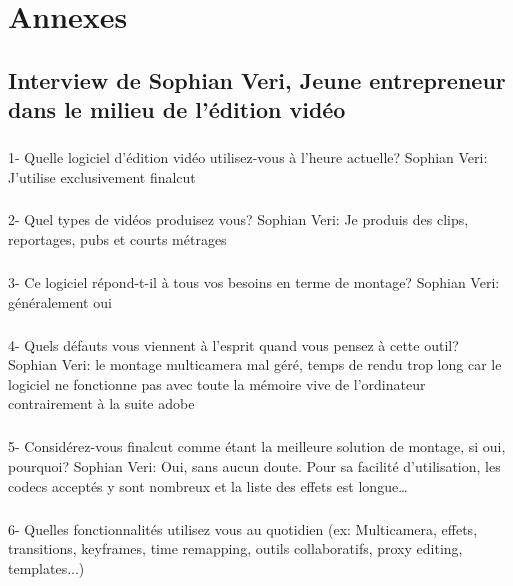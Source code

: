 \newpage

\chapter*{Annexes}
\section*{Interview de Sophian Veri,
Jeune entrepreneur dans le milieu de l'édition vidéo}

\paragraph{}
1-  Quelle logiciel d'édition vidéo utilisez-vous à l'heure actuelle?
Sophian Veri: J'utilise exclusivement finalcut

\paragraph{}
2- Quel types de vidéos produisez vous?
Sophian Veri: Je produis des clips, reportages, pubs et courts métrages

\paragraph{}
3- Ce logiciel répond-t-il à tous vos besoins en terme de montage?
Sophian Veri: généralement oui

\paragraph{}
4- Quels défauts vous viennent à l'esprit quand vous pensez à cette outil?
Sophian Veri: le montage multicamera mal géré, temps de rendu trop long car le
logiciel ne fonctionne pas avec toute la mémoire vive de l'ordinateur
contrairement à la suite adobe

\paragraph{}
5- Considérez-vous finalcut comme étant la meilleure solution de montage,
si oui, pourquoi?
Sophian Veri: Oui, sans aucun doute. Pour sa facilité d'utilisation,
les codecs acceptés y sont nombreux et la liste des effets est
longue\ldots

\paragraph{}
6-  Quelles fonctionnalités utilisez vous au quotidien (ex: Multicamera, effets,
transitions, keyframes, time remapping, outils collaboratifs, proxy
editing, templates...)


